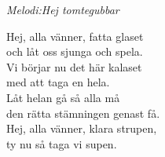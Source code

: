 {\footnotesize\textit{Melodi:Hej tomtegubbar}}\par
\vspace{10pt}
Hej, alla vänner, fatta glaset\\
och låt oss sjunga och spela.\\
Vi börjar nu det här kalaset\\
med att taga en hela.\\
Låt helan gå så alla må\\
den rätta stämningen genast få.\\
Hej, alla vänner, klara strupen,\\
ty nu så taga vi supen.

